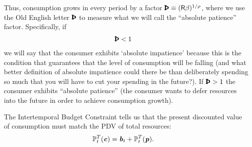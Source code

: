 \documentclass{scrartcl}
\begin{document}
Thus, consumption grows in every period by a factor $\APFac \equiv (\Rfree\DiscFac)^{1/\CRRA}$, where we use the Old English letter $\APFac$ to measure what we will call the ``absolute patience'' factor.
Specifically, if 
\begin{equation}\begin{gathered}\begin{aligned}
     \APFac & <  1 \label{eq:AIC}
\end{aligned}\end{gathered}\end{equation}
we will say that the consumer exhibits `absolute impatience' because this is the condition that guarantees that the level of consumption will be falling (and what better definition of absolute impatience could there be than deliberately spending so much that you will have to cut your spending in the future?).
If $\APFac > 1$ the consumer exhibits ``absolute patience'' (the consumer wants to defer resources into the future in order to achieve consumption growth).


The Intertemporal Budget Constraint tells us that the present discounted 
value of consumption must match the PDV of total resources:
\begin{equation}\begin{gathered}\begin{aligned}
        {\mathbb{P}}_{t}^{T}(\boldsymbol{\mathit{c}}) & =  \boldsymbol{\mathit{b}}_{t}+{\mathbb{P}}_{t}^{T}(\boldsymbol{\mathit{p}}).
        \label{eq:ibc}
\end{aligned}\end{gathered}\end{equation}
\end{document}
